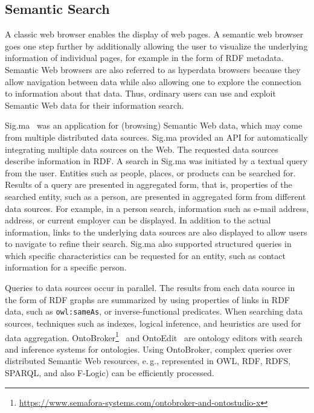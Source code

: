 \documentclass[a4paper,USenglish]{tgdk-v2021}
\newcommand{\myurl}[1]{\footnote{\url{#1}}}
\begin{document}
\subsection{Semantic Search}

A classic web browser enables the display of web pages.
A semantic web browser goes one step further by additionally allowing the user to visualize the underlying information of individual pages, for example in the form of RDF metadata. 
Semantic Web browsers are also referred to as hyperdata browsers because they allow navigation between data while also allowing one to explore the connection to information about that data.
Thus, ordinary users can use and exploit Semantic Web data for their information search.

Sig.ma~\cite{key:sigma} was an application for (browsing) Semantic Web data, which may come from multiple distributed data sources.
Sig.ma provided an API for automatically integrating multiple data sources on the Web.
The requested data sources describe information in RDF.
A search in Sig.ma was initiated by a textual query from the user.
Entities such as people, places, or products can be searched for.
Results of a query are presented in aggregated form, that is, properties of the searched entity, such as a person, are presented in aggregated form from different data sources. 
For example, in a person search, information such as e-mail address, address, or current employer can be displayed.
In addition to the actual information, links to the underlying data sources are also displayed to allow users to navigate to refine their search.
Sig.ma also supported structured queries in which specific characteristics can be requested for an entity, such as contact information for a specific person.

Queries to data sources occur in parallel. 
The results from each data source in the form of RDF graphs are summarized by using properties of links in RDF data, such as \texttt{owl:sameAs}, or inverse-functional predicates.
When searching data sources, techniques such as indexes, logical inference, and heuristics are used for data aggregation.
OntoBroker\myurl{https://www.semafora-systems.com/ontobroker-and-ontostudio-x}~\cite{Decker1999} and OntoEdit~\cite{10.1007/3-540-48005-6_18} are ontology editors with search and inference systems for ontologies. 
Using OntoBroker, complex queries over distributed Semantic Web resources, e.\,g., represented in OWL, RDF, RDFS, SPARQL, and also F-Logic) can be efficiently processed.
\end{document}
